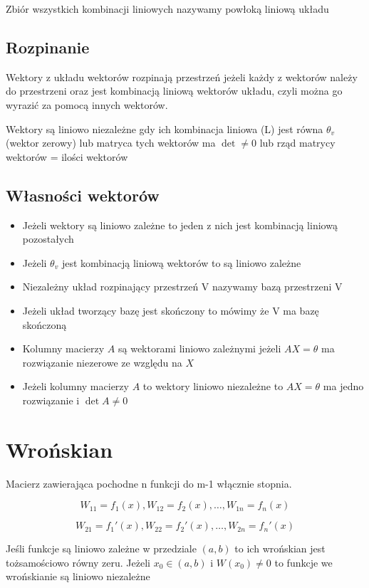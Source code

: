 \documentclass{../notatki}
\begin{document}
Zbiór wszystkich kombinacji liniowych nazywamy powłoką liniową układu

\subsection{Rozpinanie}

Wektory z układu wektorów rozpinają przestrzeń jeżeli każdy z wektorów należy do przestrzeni oraz jest kombinacją liniową wektorów układu, czyli można go wyrazić za pomocą innych wektorów.

Wektory są liniowo niezależne gdy ich kombinacja liniowa (L) jest równa $\theta_v$(wektor zerowy) lub matryca tych wektorów ma $\det \ne 0$ lub rząd matrycy wektorów = ilości wektorów

\subsection{Własności wektorów}

\begin{itemize}
    \item Jeżeli wektory są liniowo zależne to jeden z nich jest kombinacją liniową pozostałych
    \item Jeżeli $\theta_v$ jest kombinacją liniową wektorów to są liniowo zależne
    \item Niezależny układ rozpinający przestrzeń V nazywamy bazą przestrzeni V
    \item Jeżeli układ tworzący bazę jest skończony to mówimy że V ma bazę skończoną
    \item Kolumny macierzy $A$ są wektorami liniowo zależnymi jeżeli $AX = \theta$ ma rozwiązanie niezerowe ze względu na $X$
    \item Jeżeli kolumny macierzy $A$ to wektory liniowo niezależne to $AX = \theta$ ma jedno rozwiązanie i $\det A \ne 0$
\end{itemize}

\section{Wrońskian}

Macierz zawierająca pochodne n funkcji do m-1 włącznie stopnia. 

$$
W_{11} = f_1(x), W_{12} = f_2(x), \dots, W_{1n} = f_n(x)
$$

$$
W_{21} = f_1'(x), W_{22} = f_2'(x), \dots, W_{2n} = f_n'(x)
$$

Jeśli funkcje są liniowo zależne w przedziale $(a,b)$ to ich wrońskian jest tożsamościowo równy zeru.
Jeżeli $x_0 \in (a, b)$ i $W(x_0) \ne 0$ to funkcje we wrońskianie są liniowo niezależne 
\end{document}
